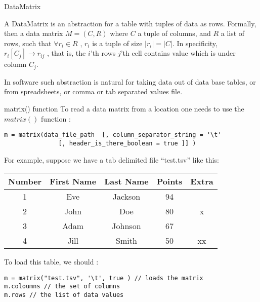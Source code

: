 \begin{section}{DataMatrix}

A DataMatrix is an abstraction for a table with tuples of data as rows.
Formally, then a data matrix $M = (C,R) $ where $C$ a tuple of columns,
and $R$ a list of rows, such that  $\forall r_i \in R$ , $r_i$ is a tuple
of size $|r_i| = |C|$. In specificity, $r_i[C_j] \to r_{ij}$ , that is, 
the $i$'th rows $j$'th cell contains value which is under column $C_j$.

In software such abstraction is natural for taking data out of data base tables, 
or from spreadsheets, or comma or tab separated values file.   

\begin{subsection}{matrix() function}
To read a data matrix from a location one needs to use the $matrix()$ function :

\begin{lstlisting}[style=JexlStyle]
m = matrix(data_file_path  [, column_separator_string = '\t' 
               [, header_is_there_boolean = true ]] )
\end{lstlisting}

For example, suppose we have a tab delimited file ``test.tsv''  like this:

\begin{center}\label{matrix}
\begin{tabular}{ |c|c|c|c|c| } 
 \hline
 Number	& First Name & Last Name & Points & Extra \\ 
 \hline 
   1    & Eve	     & Jackson	& 94      & \\
   2    & John       &  Doe	    & 80      &  x \\ 
   3    & Adam       & Johnson	& 67      &  \\	
   4    & Jill       & Smith	& 50      & xx \\  
 \hline
\end{tabular}
\end{center}

To load this table, we should :
 

\begin{center}\begin{minipage}{\linewidth}
\begin{lstlisting}[style=JexlStyle]
m = matrix("test.tsv", '\t', true ) // loads the matrix 
m.coloumns // the set of columns 
m.rows // the list of data values
\end{lstlisting}
\end{minipage}\end{center}


\end{subsection}
\end{section}
